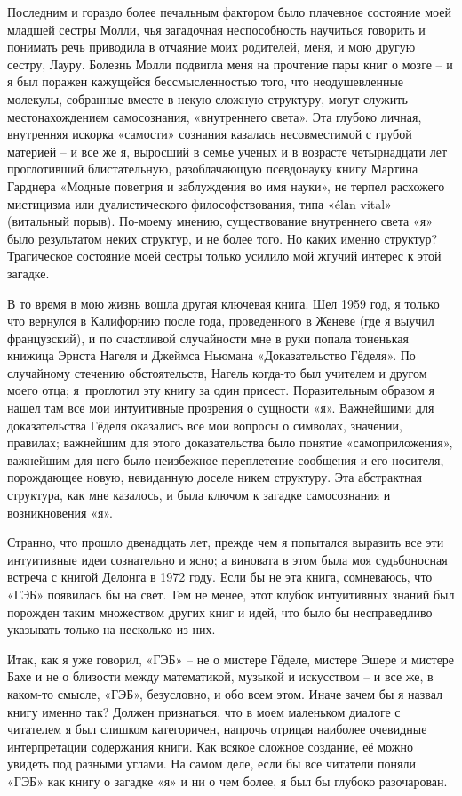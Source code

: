 \documentclass[../main.tex]{subfiles}
\begin{document}
Последним и гораздо более печальным фактором было плачевное состояние моей младшей сестры Молли, чья загадочная неспособность научиться говорить и понимать речь приводила в отчаяние моих родителей, меня, и мою другую сестру, Лауру. Болезнь Молли подвигла меня на прочтение пары книг о мозге \--- и я был поражен кажущейся бессмысленностью того, что неодушевленные молекулы, собранные вместе в некую сложную структуру, могут служить местонахождением самосознания, «внутреннего света». Эта глубоко личная, внутренняя искорка «самости» сознания казалась несовместимой с грубой материей \--- и все же я, выросший в семье ученых и в возрасте четырнадцати лет проглотивший блистательную, разоблачающую псевдонауку книгу Мартина Гарднера «Модные поветрия и заблуждения во имя науки», не терпел расхожего мистицизма или дуалистического философствования, типа «\'elаn vital» (витальный порыв). По-моему мнению, существование внутреннего света «я» было результатом неких структур, и не более того. Но каких именно структур? Трагическое состояние моей сестры только усилило мой жгучий интерес к этой загадке.

В то время в мою жизнь вошла другая ключевая книга. Шел 1959 год, я только что вернулся в Калифорнию после года, проведенного в Женеве (где я выучил французский), и по счастливой случайности мне в руки попала тоненькая книжица Эрнста Нагеля и Джеймса Ньюмана «Доказательство Гёделя». По случайному стечению обстоятельств, Нагель когда-то был учителем и другом моего отца; я~проглотил эту книгу за один присест. Поразительным образом я нашел там все мои интуитивные прозрения о сущности «я». Важнейшими для доказательства Гёделя оказались все мои вопросы о символах, значении, правилах; важнейшим для этого доказательства было понятие «самоприложения», важнейшим для него было неизбежное переплетение сообщения и его носителя, порождающее новую, невиданную доселе никем структуру. Эта абстрактная структура, как мне казалось, и была ключом к загадке самосознания и возникновения «я».

Странно, что прошло двенадцать лет, прежде чем я попытался выразить все эти интуитивные идеи сознательно и ясно; а виновата в этом была моя судьбоносная встреча с книгой Делонга в 1972 году. Если бы не эта книга, сомневаюсь, что «ГЭБ» появилась бы на свет. Тем не менее, этот клубок интуитивных знаний был порожден таким множеством других книг и идей, что было бы несправедливо указывать только на несколько из них.

Итак, как я уже говорил, «ГЭБ» \--- не о мистере Гёделе, мистере Эшере и мистере Бахе и не о близости между математикой, музыкой и искусством \--- и все же, в каком-то смысле, «ГЭБ», безусловно, и обо всем этом. Иначе зачем бы я назвал книгу именно так? Должен признаться, что в моем маленьком диалоге с читателем я был слишком категоричен, напрочь отрицая наиболее очевидные интерпретации содержания книги. Как всякое сложное создание, её можно увидеть под разными углами. На самом деле, если бы все читатели поняли «ГЭБ» как книгу о загадке «я» и ни о чем более, я был бы глубоко разочарован.
\end{document}
